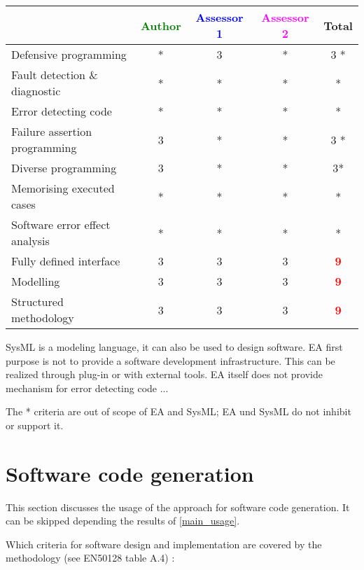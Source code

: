 \begin{tabular}{|l | c | c | c | c|}
\hline
& \textcolor{green}{Author} & \textcolor{blue}{Assessor 1} & \textcolor{magenta}{Assessor 2} & Total \\
\hline
Defensive programming  &* & 3     & *& 3    * \\
\hline 
Fault detection \& diagnostic  &* & *& *& * \\
\hline
Error detecting code  &* & *& *& * \\
\hline
Failure assertion programming &3 & *& *& 3    * \\
\hline
Diverse programming &3 & *& *&  3* \\
\hline
Memorising executed cases &* & *&* & * \\
\hline
Software error effect analysis &* & *&* & * \\
\hline
Fully defined interface &3 & 3     & 3    & \textcolor{red}{\textbf{9}} \\
\hline
Modelling  &3 & 3    & 3    & \textcolor{red}{\textbf{9}} \\
\hline
Structured methodology &3 & 3    & 3    & \textcolor{red}{\textbf{9}} \\
\hline
\end{tabular}
\begin{author_comment}
SysML is a modeling language, it can also be used to design
software. EA first purpose is not to provide a software development
infrastructure. This can be realized through plug-in or with external
tools.
EA itself does not provide mechanism for error detecting code ...
\end{author_comment}

\begin{assessor1}
The * criteria are out of scope of EA and SysML; EA und SysML do not inhibit or support it.
\end{assessor1}

\section{Software code generation}
This section discusses the usage of the approach for software code generation.
It can be skipped depending the results of \ref{main_usage}.

Which criteria for software design and implementation are covered by the methodology
(see EN50128 table A.4) :

